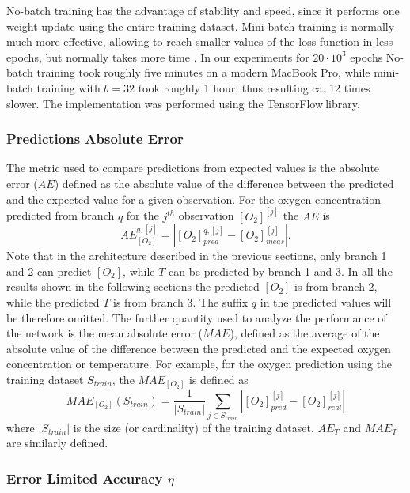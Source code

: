 \documentclass[9pt,twocolumn,twoside,pdftex]{optica}
\begin{document}
No-batch training has the advantage of stability and speed, since it performs one weight update using the entire training dataset. Mini-batch training is normally much more effective, allowing to reach smaller values of the loss function in less epochs, but normally takes more time \cite{Michelucci2017}. In our experiments for $20 \cdot 10^3$ epochs No-batch training took roughly five minutes on a modern MacBook Pro, while mini-batch training with $b=32$ took roughly 1 hour, thus resulting ca. 12 times slower. 
The implementation was performed using the TensorFlow\texttrademark $\ $library. 

\subsubsection{Predictions Absolute Error}

The metric used to compare predictions from expected values is the absolute error ($AE$) defined as the absolute value of the difference between the predicted and the expected value for a given observation. For the oxygen concentration predicted from branch $q$ for the 
$j^{th}$ observation $[O_2]^{[j]}$  the $AE$ is 
\begin{equation}
\label{AE}
AE^{q,{[j]}}_{[O_2]} = |[O_2]^{q,{[j]}}_{pred}-[O_2]^{[j]}_{meas}|.
\end{equation}
Note that in the architecture described in the previous sections, only branch 1 and 2 can predict $[O_2]$, while $T$ can be predicted by branch 1 and 3. In all the results shown in the following sections the predicted $[O_2]$ is from branch 2, while the predicted $T$ is from branch 3. The suffix $q$ in the predicted values will be therefore omitted.
The further quantity used to analyze the performance of the network is the mean absolute error ($MAE$), defined as the average of the absolute value of the difference between the predicted and the expected oxygen concentration or temperature. For example, for the oxygen prediction using the training dataset $S_{train}$, the $MAE_{[O_2]}$ is defined as 
\begin{equation}
\label{MAE}
MAE_{[O_2]}(S_{train}) = \frac{1}{|S_{train}|} \sum_{j \in S_{train}}|[O_2]_{pred}^{[j]}-[O_2]_{real}^{[j]}|
\end{equation}
where $|S_{train}|$ is the size (or cardinality) of the training dataset. 
$AE_{T}$ and $MAE_T$ are similarly defined.


\subsubsection{Error Limited Accuracy $\eta$}
\label{sektion:ela}
\end{document}
